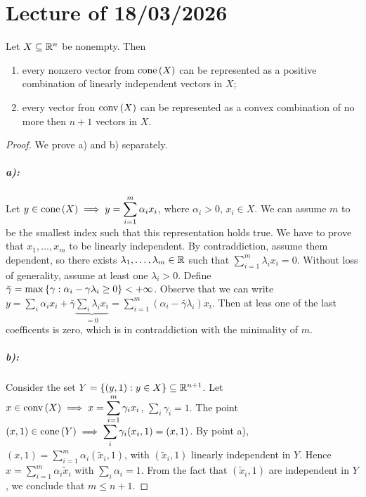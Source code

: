 \chapter{Lecture \thechapter{} of 18/03/2026}

\begin{theorem}

    Let $X \subseteq {\mathbb{R}^n}$ be nonempty. Then
    
    \begin{enumerate}
        \item[a)] every nonzero vector from $\mathrm{cone}\left(X\right)$ can be represented as a positive combination of linearly independent vectors in $X$;
        \item[b)] every vector fron $\mathrm{conv}\left(X\right)$ can be represented as a convex combination of no more then $n+1$ vectors in $X$.
    \end{enumerate}
    
\end{theorem}

\begin{proof}
    
    We prove a) and b) separately.

    \paragraph{a):} Let $y \in \mathrm{cone}\left(X\right) \implies y = \displaystyle\sum_{i=1}^m \alpha_i x_i$, where $\alpha_i > 0$, $x_i \in X$. We can assume $m$ to be the smallest index such that this representation holds true. We have to prove that $x_1,\dots,x_m$ to be linearly independent. By contraddiction, assume them dependent, so there exists $\lambda_1,\dots,\lambda_m \in \mathbb{R}$ such that $\displaystyle\sum_{i=1}^m \lambda_i x_i = 0$. Without loss of generality, assume at least one $\lambda_i > 0$. Define $\bar{\gamma} = \max\left\{ \gamma : \alpha_i -\gamma\lambda_i \ge 0 \right\} < +\infty$. Observe that we can write $y = \displaystyle\sum_i \alpha_i x_i + \bar{\gamma} \underbrace{\displaystyle\sum_i \lambda_i x_i}_{=0} = \displaystyle\sum_{i=1}^m (\alpha_i - \bar{\gamma}\lambda_i)x_i$. Then at leas one of the last coefficents is zero, which is in contraddiction with the minimality of $m$.

    \paragraph{b):} Consider the set $Y = \left\{ (y,1) : y \in X \right\} \subseteq {\mathbb{R}^{n+1}}$. Let $x \in \mathrm{conv}\left(X\right) \implies x = \displaystyle\sum_{i=1}^m \gamma_i x_i$, $\displaystyle\sum_i\gamma_i = 1$. The point $(x,1) \in \mathrm{cone}\left(Y\right) \implies \displaystyle\sum_i \gamma_i (x_i,1) = (x,1)$. By point a), $(x,1) = \displaystyle\sum_{i=1}^m \alpha_i(\tilde{x}_i,1)$, with $(\tilde{x}_i,1)$ linearly independent in $Y$. Hence $x = \displaystyle\sum_{i=1}^m \alpha_i \tilde{x}_i$ with $\displaystyle\sum_i \alpha_i = 1$. From the fact that $(\tilde{x}_i,1)$ are independent in $Y$, we conclude that $m \le n+1$.

\end{proof}

